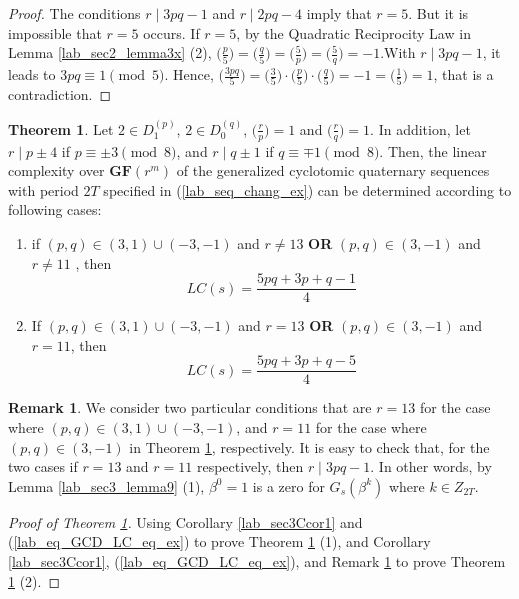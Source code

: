 \documentclass{mcom-l}
\theoremstyle{definition}
\newtheorem{sec3Cremark1}[sec3_remark1]{Remark}
\newtheorem{sec3CThm01}[sec3thm1]{Theorem}
\numberwithin{equation}{section}
\begin{document}
     \begin{proof}
     The conditions $ r\mid 3pq-1 $ and $ r\mid 2pq-4 $ imply that $ r=5 $. But it is impossible that $ r=5 $ occurs. If $ r=5 $, by the Quadratic Reciprocity Law in Lemma \ref{lab_sec2_lemma3x} (2), $ \bigl(\tfrac{p}{5}\bigr) =\bigl(\tfrac{q}{5}\bigr)=\bigl(\tfrac{5}{p}\bigr)=\bigl(\tfrac{5}{q}\bigr)=-1$.With  $ r\mid 3pq-1 $, it leads to $ 3pq\equiv 1\pmod 5 $. Hence, $ \bigl(\tfrac{3pq}{5}\bigr)=\bigl(\tfrac{3}{5}\bigr)\cdot\bigl(\tfrac{p}{5}\bigr) \cdot\bigl(\tfrac{q}{5}\bigr)=-1=\bigl(\tfrac{1}{5}\bigr)=1$, that is a contradiction.    
     \end{proof} 
     \begin{sec3CThm01}\label{lab_sec3CThm01}
    Let $ 2\in D_{1}^{(p)} $, $ 2\in D_{0}^{(q)} $, $ \bigl(\tfrac{r}{p}\bigr) =1$ and $ \bigl(\tfrac{r}{q}\bigr) =1$. In addition, let  $ r\mid p\pm 4 $ if $ p\equiv\pm 3\pmod 8 $, and $ r\mid q\pm 1 $ if $ q\equiv\mp 1\pmod 8 $.
    Then, the linear complexity over $ \mathbf{GF}(r^{m})$ of the generalized cyclotomic quaternary sequences with period $ 2T $ specified in (\ref{lab_seq_chang_ex}) can be determined according to following cases:
     \begin{enumerate} \item if $ (p,q)\in (3,1)\cup (-3,-1) $ and $r\ne 13$ \textbf{OR} $ (p,q)\in (3,-1)$ and $ r\ne 11$ , then
     \begin{equation*}
     LC(s)=\frac{5pq+3p+q-1}{4}
     \end{equation*}
    
      \item If $ (p,q)\in (3,1)\cup (-3,-1) $ and $r= 13$ \textbf{OR} $ (p,q)\in (3,-1)$ and $ r= 11$, then
     \begin{equation*}
     LC(s)=\frac{5pq+3p+q-5}{4}
      \end{equation*}
      \end{enumerate}
     \end{sec3CThm01}
     \begin{sec3Cremark1}\label{Lab_sec3Cremark1}
     We consider two particular conditions that are $ r=13 $ for the case where $ (p,q)\in (3,1)\cup (-3,-1) $, and $ r=11 $ for the case where $ (p,q)\in (3,-1)$ in Theorem \ref{lab_sec3CThm01}, respectively. It is easy to check that, for the two cases if  $ r=13 $ and $ r=11 $ respectively, then $ r\mid 3pq-1 $. In other words, by Lemma \ref{lab_sec3_lemma9} (1), $ \beta^{0} =1$ is a zero for $ G_{s}(\beta^{k}) $ where $ k\in Z_{2T} $.
     \end{sec3Cremark1}
     \begin{proof}[Proof of Theorem \ref{lab_sec3CThm01}]
     Using Corollary \ref{lab_sec3Ccor1} and (\ref{lab_eq_GCD_LC_eq_ex}) to prove Theorem \ref{lab_sec3CThm01} (1), and  Corollary \ref{lab_sec3Ccor1}, (\ref{lab_eq_GCD_LC_eq_ex}), and Remark \ref{Lab_sec3Cremark1} to prove Theorem \ref{lab_sec3CThm01} (2).
     \end{proof}
      
\end{document}
